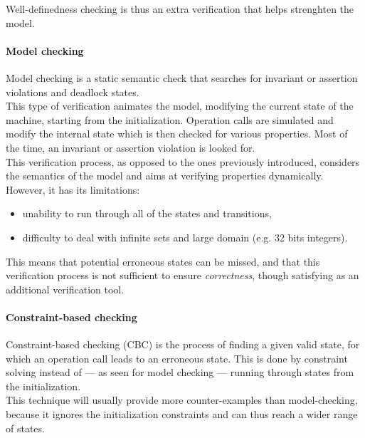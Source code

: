Well-definedness checking is thus an extra verification that helps strenghten the model.

\paragraph{Model checking}
Model checking is a static semantic check that searches for invariant or assertion violations and deadlock states.\\
This type of verification animates the model, modifying the current state of the machine, starting from the initialization. Operation calls are simulated and modify the internal state which is then checked for various properties. Most of the time, an invariant or assertion violation is looked for.\\

This verification process, as opposed to the ones previously introduced, considers the semantics of the model and aims at verifying properties dynamically. However, it has its limitations:
\begin{itemize}
\item unability to run through all of the states and transitions,
\item difficulty to deal with infinite sets and large domain (e.g. 32 bits integers).
\end{itemize}
This means that potential erroneous states can be missed, and that this verification process is not sufficient to ensure {\itshape correctness}, though satisfying as an additional verification tool.

\paragraph{Constraint-based checking}

Constraint-based checking (CBC) is the process of finding a given valid state, for which an operation call leads to an erroneous state. This is done by constraint solving instead of --- as seen for model checking --- running through states from the initialization.\\
This technique will usually provide more counter-examples than model-checking, because it ignores the initialization constraints and can thus reach a wider range of states.

